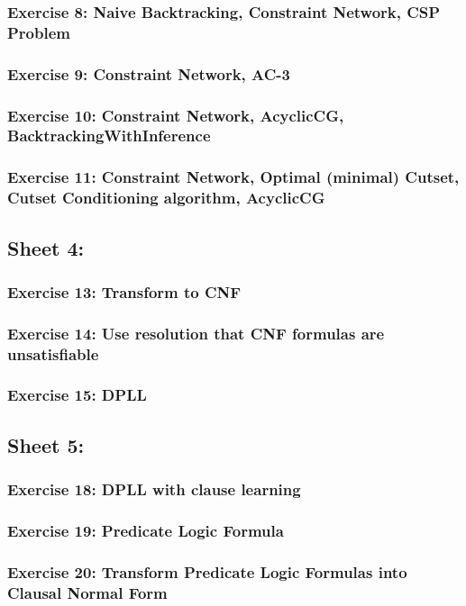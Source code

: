 \documentclass{article}
\begin{document}
        \subsubsection{Exercise 8: Naive Backtracking, Constraint Network, CSP Problem}
        \subsubsection{Exercise 9: Constraint Network, AC-3}
        \subsubsection{Exercise 10: Constraint Network, AcyclicCG, BacktrackingWithInference}
        \subsubsection{Exercise 11: Constraint Network, Optimal (minimal) Cutset, Cutset Conditioning algorithm, AcyclicCG}
    \subsection{Sheet 4:}
        \subsubsection{Exercise 13: Transform to CNF}
        \subsubsection{Exercise 14: Use resolution that CNF formulas are unsatisfiable}
        \subsubsection{Exercise 15: DPLL}
\newpage
    \subsection{Sheet 5:}
        \subsubsection{Exercise 18: DPLL with clause learning}
        \subsubsection{Exercise 19: Predicate Logic Formula}
        \subsubsection{Exercise 20: Transform Predicate Logic Formulas into Clausal Normal Form}
\end{document}
